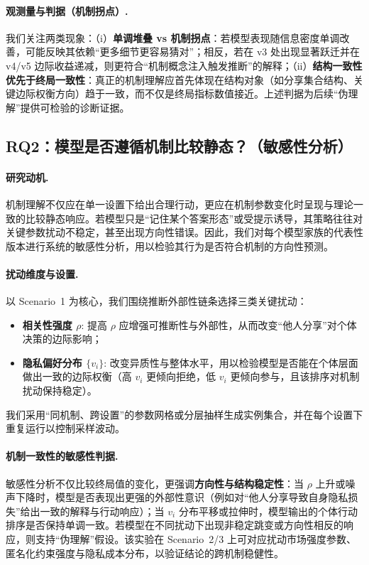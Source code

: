 \paragraph{观测量与判据（机制拐点）.}
我们关注两类现象：（i）\textbf{单调堆叠 vs 机制拐点}：若模型表现随信息密度单调改善，可能反映其依赖“更多细节更容易猜对”；相反，若在 v3 处出现显著跃迁并在 v4/v5 边际收益递减，则更符合“机制概念注入触发推断”的解释；（ii）\textbf{结构一致性优先于终局一致性}：真正的机制理解应首先体现在结构对象（如分享集合结构、关键边际权衡方向）趋于一致，而不仅是终局指标数值接近。上述判据为后续“伪理解”提供可检验的诊断证据。

\subsection{RQ2：模型是否遵循机制比较静态？（敏感性分析）}
\label{subsec:rq2}

\paragraph{研究动机.}
机制理解不仅应在单一设置下给出合理行动，更应在机制参数变化时呈现与理论一致的比较静态响应。若模型只是“记住某个答案形态”或受提示诱导，其策略往往对关键参数扰动不稳定，甚至出现方向性错误。因此，我们对每个模型家族的代表性版本进行系统的敏感性分析，用以检验其行为是否符合机制的方向性预测。

\paragraph{扰动维度与设置.}
以 Scenario~1 为核心，我们围绕推断外部性链条选择三类关键扰动：
\begin{itemize}
  \item \textbf{相关性强度 $\rho$}: 提高 $\rho$ 应增强可推断性与外部性，从而改变“他人分享”对个体决策的边际影响；
  \item \textbf{隐私偏好分布 $\{v_i\}$}: 改变异质性与整体水平，用以检验模型是否能在个体层面做出一致的边际权衡（高 $v_i$ 更倾向拒绝，低 $v_i$ 更倾向参与，且该排序对机制扰动保持稳定）。
\end{itemize}
我们采用“同机制、跨设置”的参数网格或分层抽样生成实例集合，并在每个设置下重复运行以控制采样波动。

\paragraph{机制一致性的敏感性判据.}
敏感性分析不仅比较终局值的变化，更强调\textbf{方向性与结构稳定性}：当 $\rho$ 上升或噪声下降时，模型是否表现出更强的外部性意识（例如对“他人分享导致自身隐私损失”给出一致的解释与行动响应）；当 $v_i$ 分布平移或拉伸时，模型输出的个体行动排序是否保持单调一致。若模型在不同扰动下出现非稳定跳变或方向性相反的响应，则支持“伪理解”假设。该实验在 Scenario~2/3 上可对应扰动市场强度参数、匿名化约束强度与隐私成本分布，以验证结论的跨机制稳健性。

